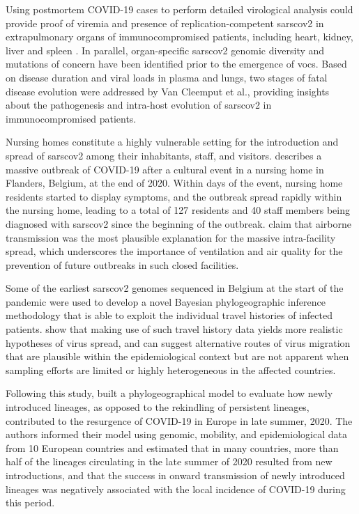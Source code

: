 Using postmortem COVID-19 cases to perform detailed virological analysis could provide proof of viremia and presence of replication-competent \gls{sarscov2} in extrapulmonary organs of immunocompromised patients, including heart, kidney, liver and spleen \citep{vancleemput2021organ-specific}.
In parallel, organ-specific \gls{sarscov2} genomic diversity and mutations of concern have been identified prior to the emergence of \gls{voc}s.
Based on disease duration and viral loads in plasma and lungs, two stages of fatal disease evolution were addressed by Van Cleemput et al., providing insights about the pathogenesis and intra-host evolution of \gls{sarscov2} in immunocompromised patients.

Nursing homes constitute a highly vulnerable setting for the introduction and spread of \gls{sarscov2} among their inhabitants, staff, and visitors.
\citet{vuylsteke2022role} describes a massive outbreak of COVID-19 after a cultural event in a nursing home in Flanders, Belgium, at the end of 2020.
Within days of the event, nursing home residents started to display symptoms, and the outbreak spread rapidly within the nursing home, leading to a total of 127 residents and 40 staff members being diagnosed with \gls{sarscov2} since the beginning of the outbreak.
\citet{vuylsteke2022role} claim that airborne transmission was the most plausible explanation for the massive intra-facility spread, which underscores the importance of ventilation and air quality for the prevention of future outbreaks in such closed facilities.

Some of the earliest \gls{sarscov2} genomes sequenced in Belgium at the start of the pandemic were used to develop a novel Bayesian phylogeographic inference methodology that is able to exploit the individual travel histories of infected patients.
\citet{lemey2020accommodating} show that making use of such travel history data yields more realistic hypotheses of virus spread, and can suggest alternative routes of virus migration that are plausible within the epidemiological context but are not apparent when sampling efforts are limited or highly heterogeneous in the affected countries.

Following this study, \citet{lemey2021untangling} built a phylogeographical model to evaluate how newly introduced lineages, as opposed to the rekindling of persistent lineages, contributed to the resurgence of COVID-19 in Europe in late summer, 2020.
The authors informed their model using genomic, mobility, and epidemiological data from 10 European countries and estimated that in many countries, more than half of the lineages circulating in the late summer of 2020 resulted from new introductions, and that the success in onward transmission of newly introduced lineages was negatively associated with the local incidence of COVID-19 during this period.


